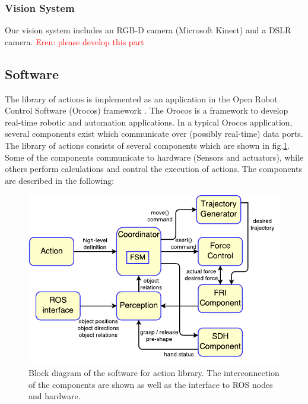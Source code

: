 \subsubsection{Vision System}
Our vision system includes an RGB-D camera (Microsoft Kinect) and a DSLR camera.
\textcolor{red}{Eren: please develop this part}

\subsection{Software}
\label{sec:software}
The library of actions is implemented as an application in the Open Robot Control Software (Orocos) framework \cite{rtt-url,soetens2006}.
The Orocos is a framework to develop real-time robotic and automation applications.
In a typical Orocos application, several components exist which communicate over (possibly real-time) data ports.
The library of actions consists of several components which are shown in fig.\ref{fig:software_structure}.
Some of the components communicate to hardware (Sensors and actuators), while others perform calculations and control the execution of actions.
The components are described in the following:
\begin{figure}
      \centering
      \includegraphics[scale=1]{./pdf/software_structure.pdf}
      \caption{ Block diagram of the software for action library.
      The interconnection of the components are shown as well as the interface to ROS nodes and hardware.
}
      \label{fig:software_structure}
\end{figure}



